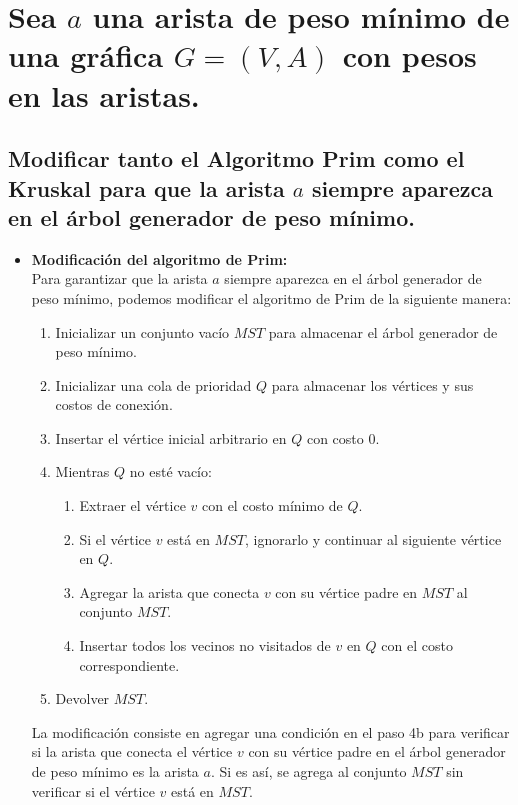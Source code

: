 \section{Sea $a$ una arista de peso mínimo de una gráfica $G = (V, A)$ con pesos
en las aristas.}

\subsection{Modificar tanto el Algoritmo Prim como el Kruskal para que
la arista $a$ siempre aparezca en el árbol generador de peso mínimo.}

\begin{itemize}
  \item  \textbf{Modificación del algoritmo de Prim:}\\
  Para garantizar que la arista $a$ siempre aparezca en el árbol generador de peso mínimo, podemos modificar el algoritmo de Prim de la siguiente manera:\\
  \begin{enumerate}
    \item Inicializar un conjunto vacío $MST$ para almacenar el árbol generador de peso mínimo.
    \item Inicializar una cola de prioridad $Q$ para almacenar los vértices y sus costos de conexión.
    \item Insertar el vértice inicial arbitrario en $Q$ con costo 0.
    \item Mientras $Q$ no esté vacío:
    \begin{enumerate}
      \item Extraer el vértice $v$ con el costo mínimo de $Q$.
      \item Si el vértice $v$ está en $MST$, ignorarlo y continuar al siguiente vértice en $Q$.
      \item Agregar la arista que conecta $v$ con su vértice padre en $MST$ al conjunto $MST$.
      \item Insertar todos los vecinos no visitados de $v$ en $Q$ con el costo correspondiente.
    \end{enumerate}
    \item Devolver $MST$.
  \end{enumerate}
  La modificación consiste en agregar una condición en el paso 4b para verificar si la arista que conecta el vértice $v$ con su vértice padre en el árbol generador de peso mínimo es la arista $a$. Si es así, se agrega al conjunto $MST$ sin verificar si el vértice $v$ está en $MST$.


\end{itemize}
